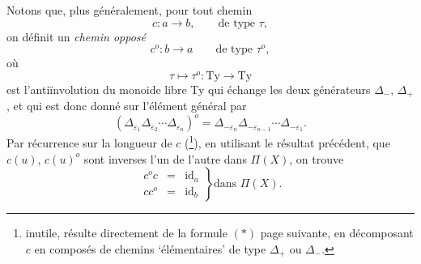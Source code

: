 Notons que, plus généralement, pour tout chemin
\[
c : a \longrightarrow b, \qquad \text{de type } \tau,
\]
on définit un \textit{chemin opposé}
\[
c^o : b \longrightarrow a \qquad \text{de type } \tau^o,
\]
où
\[
\tau \longmapsto \tau^o : \mathrm{Ty} \longrightarrow \mathrm{Ty}
\]
est l'antiïnvolution du monoide libre Ty qui échange les deux générateurs $\Delta_-$, $\Delta_+$, et qui est donc donné sur l'élément général par
\[
(\Delta_{\varepsilon_1}\Delta_{\varepsilon_2}\cdots\Delta_{\varepsilon_n})^o = \Delta_{-\varepsilon_n}\Delta_{-\varepsilon_{n-1}}\cdots\Delta_{-\varepsilon_1}.
\]
Par récurrence sur la longueur de $c$ (\footnote[18]{inutile, résulte directement de la formule $(*)$ page suivante, en décomposant $c$ en composés de chemins `élémentaires' de type $\Delta_+$ ou $\Delta_-$.}), en utilisant le résultat précédent, que $c(u)$, $c(u)^o$ sont inverses l'un de l'autre dans $\Pi(X)$, on trouve
\[
\left.
\begin{array}{rcl}
c^o c & = & \mathrm{id}_a\\
c c^o & = & \mathrm{id}_b
\end{array}
\right\}\text{dans } \Pi(X).
\]

